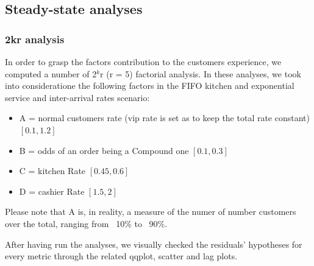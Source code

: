 \subsection{Steady-state analyses}

\subsubsection{2kr analysis}
In order to grasp the factors contribution to the customers experience, we computed a number of 2$^k$r (r = 5) factorial analysis. In these analyses, we took into 
consideratione the following factors in the FIFO kitchen and exponential service and inter-arrival rates scenario: 
\begin{itemize}
  \item A = normal customers rate (vip rate is set as to keep the total rate constant) $[0.1, 1.2]$
  \item B = odds of an order being a Compound one $[0.1, 0.3]$
  \item C = kitchen Rate $[0.45, 0.6]$
  \item D = cashier Rate $[1.5, 2]$
\end{itemize}
Please note that A is, in reality, a measure of the numer of number customers 
over the total, ranging from ~10\% to ~90\%.

After having run the analyses, we visually checked the residuals' hypotheses for every metric through the related qqplot, scatter and lag plots. %

